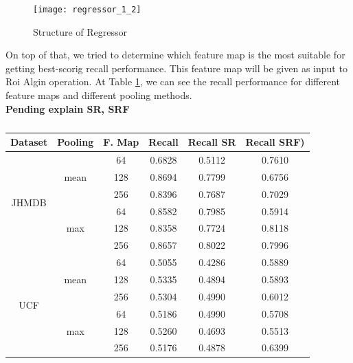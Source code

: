 \begin{figure}[h]

  \centering
  \texttt{[image: regressor\_1\_2]}
  \caption{Structure of Regressor}
  \label{fig:reg_1_2}
\end{figure}

On top of that, we tried to determine which feature map is the most suitable  for getting best-scorig recall performance. This feature map will be given as
input to Roi Algin operation.  At Table \ref{table:reg_1_2}, we can see the recall performance for different feature maps and different pooling methods.
\\
\textbf{Pending explain SR, SRF}

\begin{table}[h]
  \centering
  \begin{tabular}{||c | c | c || c  c  c ||}
    \hline
    \textbf{Dataset} & \textbf{Pooling} & \textbf{F. Map} & \textbf{Recall} &  \textbf{ Recall SR}  &  \textbf{Recall SRF)} \\
    \hline
    \multirow{6}{*}{JHMDB} & \multirow{3}{*}{mean} & 64 &  0.6828  & 0.5112  & 0.7610 \\
    \cline{3-6}
    {} & {} & 128 & 0.8694 & 0.7799 & 0.6756 \\
    \cline{3-6}
    {} & {} & 256 & 0.8396 & 0.7687 & 0.7029 \\
    \cline{2-6}
    {} & \multirow{3}{*}{max} & 64 &  0.8582 & 0.7985 & 0.5914\\
    \cline{3-6}
    {} & {} & 128 & 0.8358 & 0.7724 & 0.8118 \\
    \cline{3-6}
    {} & {} & 256 & 0.8657 & 0.8022 & 0.7996 \\
    \hline
    \multirow{6}{*}{UCF} & \multirow{3}{*}{mean} & 64 & 0.5055 & 0.4286 & 0.5889 \\
    \cline{3-6}
    {} & {} & 128 & 0.5335 & 0.4894 & 0.5893 \\
    \cline{3-6}
    {} & {} & 256 & 0.5304 & 0.4990 & 0.6012 \\
    \cline{2-6}
    {} & \multirow{3}{*}{max} & 64 & 0.5186 & 0.4990 & 0.5708 \\
    \cline{3-6}
    {} & {} & 128 & 0.5260 & 0.4693 & 0.5513 \\
    \cline{3-6}
    {} & {} & 256 & 0.5176 & 0.4878 & 0.6399 \\
    \hline


  \end{tabular}
  \caption{}
  \label{table:reg_1_2}
\end{table}

